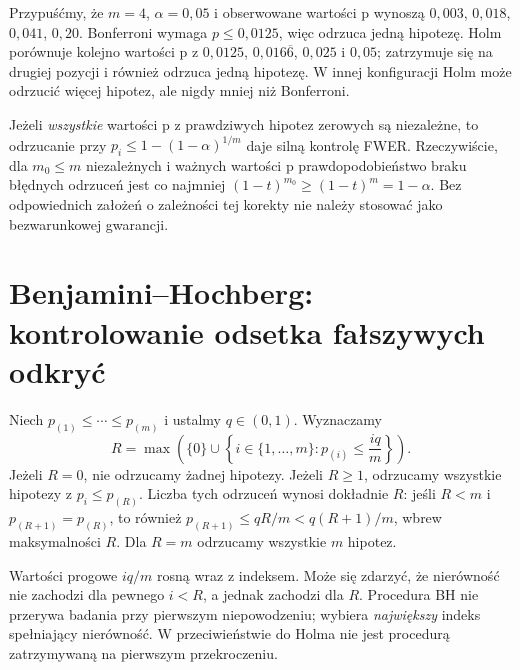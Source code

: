 \begin{przyklad}
Przypuśćmy, że $m=4$, $\alpha=0{,}05$ i obserwowane
wartości p wynoszą
$0{,}003$, $0{,}018$, $0{,}041$, $0{,}20$.
Bonferroni wymaga $p\le0{,}0125$, więc odrzuca
jedną hipotezę. Holm porównuje kolejno wartości p z
$0{,}0125$, $0{,}016\overline6$, $0{,}025$ i
$0{,}05$; zatrzymuje się na drugiej pozycji i również
odrzuca jedną hipotezę. W innej konfiguracji Holm może
odrzucić więcej hipotez, ale nigdy mniej niż Bonferroni.
\end{przyklad}

\begin{uwaga}
Jeżeli \emph{wszystkie} wartości p z prawdziwych hipotez
zerowych są niezależne, to odrzucanie przy
$p_i\le1-(1-\alpha)^{1/m}$ daje silną kontrolę FWER.
Rzeczywiście, dla $m_0\le m$ niezależnych i ważnych
wartości p prawdopodobieństwo braku błędnych odrzuceń
jest co najmniej $(1-t)^{m_0}\ge(1-t)^m=1-\alpha$.
Bez odpowiednich założeń o zależności tej korekty nie
należy stosować jako bezwarunkowej gwarancji.
\end{uwaga}

\section{Benjamini--Hochberg: kontrolowanie odsetka fałszywych odkryć}
\begin{definicja}
\label{def:bh}
Niech $p_{(1)}\le\cdots\le p_{(m)}$ i ustalmy
$q\in(0,1)$. Wyznaczamy
\[
 R=\max\left(\{0\}\cup
 \left\{i\in\{1,\ldots,m\}:
 p_{(i)}\le\frac{iq}{m}\right\}\right).
\]
Jeżeli $R=0$, nie odrzucamy żadnej hipotezy.
Jeżeli $R\ge1$, odrzucamy wszystkie hipotezy z
$p_i\le p_{(R)}$. Liczba tych odrzuceń wynosi dokładnie
$R$: jeśli $R<m$ i $p_{(R+1)}=p_{(R)}$, to również
$p_{(R+1)}\le qR/m<q(R+1)/m$, wbrew maksymalności $R$.
Dla $R=m$ odrzucamy wszystkie $m$ hipotez.
\end{definicja}

\begin{uwaga}
Wartości progowe $iq/m$ rosną wraz z indeksem.
Może się zdarzyć, że nierówność nie zachodzi dla pewnego
$i<R$, a jednak zachodzi dla $R$. Procedura BH nie
przerywa badania przy pierwszym niepowodzeniu; wybiera
\emph{największy} indeks spełniający nierówność.
W przeciwieństwie do Holma nie jest procedurą
zatrzymywaną na pierwszym przekroczeniu.
\end{uwaga}

